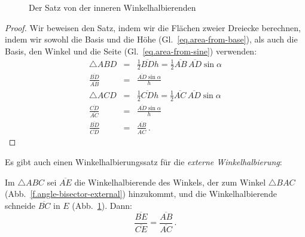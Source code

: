\begin{figure}[b]
\begin{center}
\end{center}
\caption{Der Satz von der inneren Winkelhalbierenden}\label{f.angle-bisector}
\end{figure}
\begin{proof}
Wir beweisen den Satz, indem wir die Flächen zweier Dreiecke berechnen, indem wir sowohl die Basis und die Höhe (Gl.~\ref{eq.area-from-base}), als auch die Basis, den Winkel und die Seite (Gl.~\ref{eq.area-from-sine}) verwenden:
\begin{eqnarray*}
\triangle ABD&=&\frac{1}{2}\overline{BD}h=\frac{1}{2}\overline{AB}\,\overline{AD}\sin \alpha\\
\frac{\overline{BD}}{\overline{AB}}&=&\frac{\overline{AD}\sin \alpha}{h}\\
\triangle ACD&=&\frac{1}{2}\overline{CD}h=\frac{1}{2}\overline{AC}\,\overline{AD}\sin \alpha\\
\frac{\overline{CD}}{\overline{AC}}&=&\frac{\overline{AD}\sin \alpha}{h}\\
\frac{\overline{BD}}{\overline{CD}}&=&\frac{\overline{AB}}{\overline{AC}}\,.
\end{eqnarray*}
\end{proof}
Es gibt auch einen Winkelhalbierungssatz für die \emph{externe Winkelhalbierung}:

\begin{theorem}\label{thm.external-angle-bisector}
Im $\triangle ABC$ sei $\overline{AE}$ die Winkelhalbierende des Winkels, der zum Winkel $\triangle BAC$ (Abb.~\ref{f.angle-bisector-external}) hinzukommt, und die Winkelhalbierende schneide $\overline{BC}$ in $E$ (Abb.~\ref{f.angle-bisector}). Dann:
\[
\frac {\overline{BE}}{\overline{CE}}=\frac {\overline{AB}}{\overline{AC}}\,.
\]
\end{theorem}

